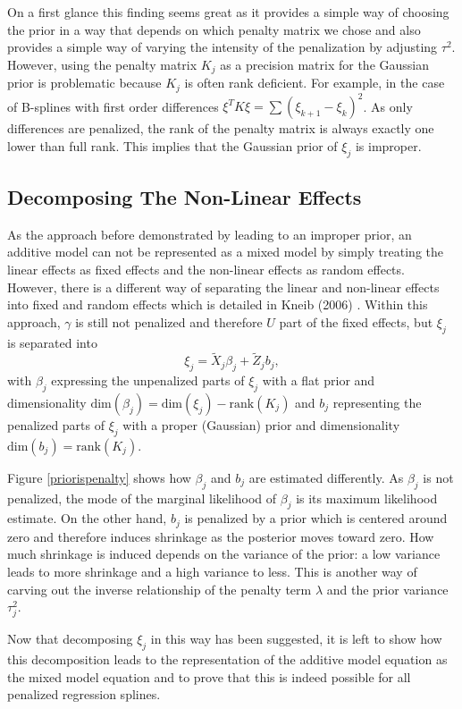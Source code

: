\documentclass[12pt]{article}
\begin{document}
On a first glance this finding seems great as it provides a simple way of choosing the prior in a way that depends on which penalty matrix we chose and also provides a simple way of varying the intensity of the penalization  by adjusting $\tau^2$. However, using the penalty matrix $K_j$ as a precision matrix for the Gaussian prior is problematic because $K_j$ is often rank deficient. For example, in the case of B-splines with first order differences $\xi^TK\xi = \sum(\xi_{k+1} - \xi_{k})^2$. As only differences are penalized, the rank of the penalty matrix is always exactly one lower than full rank. This implies that the Gaussian prior of $\xi_j$ is improper.

\subsection{Decomposing The Non-Linear Effects}

As the approach before demonstrated by leading to an improper prior, an additive model can not be represented as a mixed model by simply treating the linear effects as fixed effects and the non-linear effects as random effects. However, there is a different way of separating the linear and non-linear effects into fixed and random effects which is detailed in Kneib (2006) \cite{kneib2006mixed}. Within this approach, $\gamma$ is still not penalized and therefore $U$ part of the fixed effects, but $\xi_j$ is separated into 
$$\xi_j = \tilde{X}_j \beta_j + \tilde{Z}_j b_j,\label{decomp}$$
with $\beta_j$ expressing the unpenalized parts of $\xi_j$ with a flat prior and dimensionality 
$\text{dim}(\beta_j) = \text{dim}(\xi_j) {-} \text{rank}(K_j)$ and $b_j$ representing the penalized parts of $\xi_j$ with a proper (Gaussian) prior and dimensionality $\text{dim}(b_j) =  \text{rank}(K_j)$.

Figure \ref{priorispenalty} shows how $\beta_j$ and $b_j$ are estimated differently. As $\beta_j$ is not penalized, the mode of the marginal likelihood of $\beta_j$ is its maximum likelihood estimate. On the other hand, $b_j$ is penalized by a prior which is centered around zero and therefore induces shrinkage as the posterior moves toward zero. How much shrinkage is induced depends on the variance of the prior: a low variance leads to more shrinkage and a high variance to less. This is another way of carving out the inverse relationship of the penalty term $\lambda$ and the prior variance $\tau^2_j$.



Now that decomposing $\xi_j$ in this way has been suggested, it is left to show how this decomposition leads to the representation of the additive model equation as the mixed model equation and to prove that this is indeed possible for all penalized regression splines.
\end{document}
